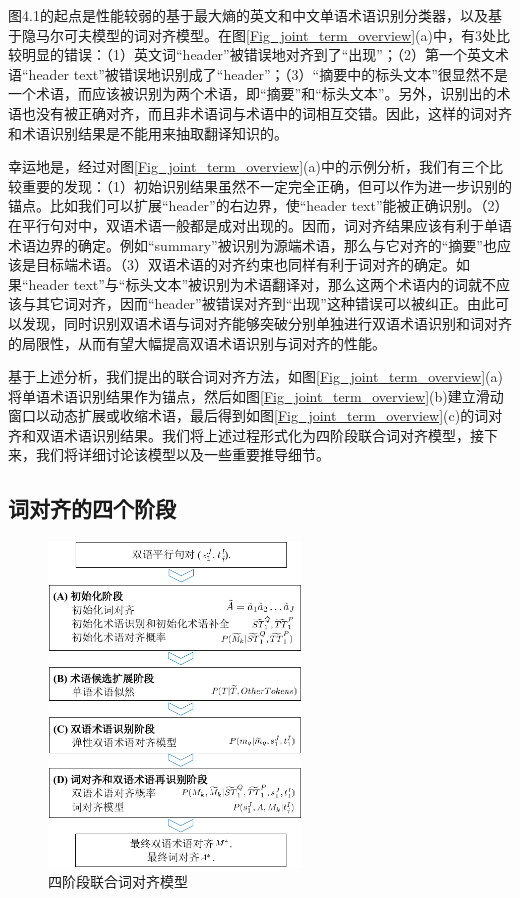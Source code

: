图4.1的起点是性能较弱的基于最大熵的英文和中文单语术语识别分类器，以及基于隐马尔可夫模型的词对齐模型。在图\ref{Fig_joint_term_overview}(a)中，有3处比较明显的错误：（1）英文词“header”被错误地对齐到了“出现”；（2）第一个英文术语“header text”被错误地识别成了“header”；（3）“摘要中的标头文本”很显然不是一个术语，而应该被识别为两个术语，即“摘要”和“标头文本”。另外，识别出的术语也没有被正确对齐，而且非术语词与术语中的词相互交错。因此，这样的词对齐和术语识别结果是不能用来抽取翻译知识的。

幸运地是，经过对图\ref{Fig_joint_term_overview}(a)中的示例分析，我们有三个比较重要的发现：（1）初始识别结果虽然不一定完全正确，但可以作为进一步识别的锚点。比如我们可以扩展“header”的右边界，使“header text”能被正确识别。（2）在平行句对中，双语术语一般都是成对出现的。因而，词对齐结果应该有利于单语术语边界的确定。例如“summary”被识别为源端术语，那么与它对齐的“摘要”也应该是目标端术语。（3）双语术语的对齐约束也同样有利于词对齐的确定。如果“header text”与“标头文本”被识别为术语翻译对，那么这两个术语内的词就不应该与其它词对齐，因而“header”被错误对齐到“出现”这种错误可以被纠正。由此可以发现，同时识别双语术语与词对齐能够突破分别单独进行双语术语识别和词对齐的局限性，从而有望大幅提高双语术语识别与词对齐的性能。

基于上述分析，我们提出的联合词对齐方法，如图\ref{Fig_joint_term_overview}(a)将单语术语识别结果作为锚点，然后如图\ref{Fig_joint_term_overview}(b)建立滑动窗口以动态扩展或收缩术语，最后得到如图\ref{Fig_joint_term_overview}(c)的词对齐和双语术语识别结果。我们将上述过程形式化为四阶段联合词对齐模型，接下来，我们将详细讨论该模型以及一些重要推导细节。

\subsection{词对齐的四个阶段}

\begin{figure}[!tb]
	\centering
	\includegraphics[width=0.6\textwidth]{Figure/Figure_4_2.pdf}
	\caption{四阶段联合词对齐模型}
	\label{Fig_joint_term_model}
\end{figure}

